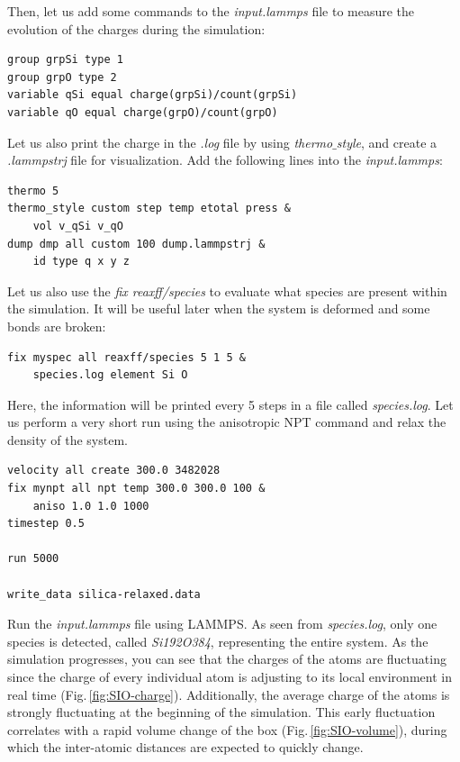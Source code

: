 \documentclass[9pt,tutorial]{livecoms}
\begin{document}
Then, let us add some commands to the \textit{input.lammps} file  to measure the evolution of the charges during the simulation:
{\normalsize \begin{verbatim}
group grpSi type 1
group grpO type 2
variable qSi equal charge(grpSi)/count(grpSi)
variable qO equal charge(grpO)/count(grpO)
\end{verbatim}}
Let us also print the charge in the \textit{.log} file by using \textit{thermo$\_$style}, and create a \textit{.lammpstrj} file for visualization. Add the following lines into the \textit{input.lammps}:
{\normalsize \begin{verbatim}
thermo 5
thermo_style custom step temp etotal press &
    vol v_qSi v_qO
dump dmp all custom 100 dump.lammpstrj &
    id type q x y z
\end{verbatim}}
Let us also use the \textit{fix reaxff/species} to evaluate what species are present within the simulation. It will be useful later when the system is deformed and some bonds are broken:
{\normalsize \begin{verbatim}
fix myspec all reaxff/species 5 1 5 & 
    species.log element Si O
\end{verbatim}}
Here, the information will be printed every 5 steps in a file called \textit{species.log}. Let us perform a very short run using the anisotropic NPT command and relax the density of the system. 
{\normalsize \begin{verbatim}
velocity all create 300.0 3482028
fix mynpt all npt temp 300.0 300.0 100 &
    aniso 1.0 1.0 1000
timestep 0.5

run 5000

write_data silica-relaxed.data
\end{verbatim}}
Run the \textit{input.lammps} file using LAMMPS. As seen from \textit{species.log}, only one species is detected, called \textit{Si192O384}, representing the entire system. As the simulation progresses, you can see that the charges of the atoms are fluctuating since the charge of every individual atom is adjusting to its local environment in real time (Fig.\,\ref{fig:SIO-charge}). Additionally, the average charge of the atoms is strongly fluctuating at the beginning of the simulation. This early fluctuation correlates with a rapid volume change of the box (Fig.\,\ref{fig:SIO-volume}), during which the inter-atomic distances are expected to quickly change.
\end{document}
